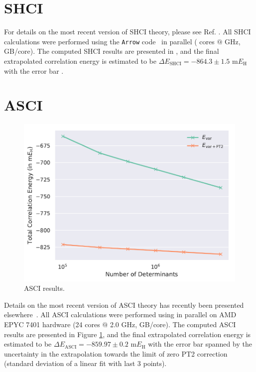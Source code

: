 \documentclass[journal=jcp,manuscript=suppinfo]{achemso}
\begin{document}
\section{SHCI}

For details on the most recent version of SHCI theory, please see Ref. . All SHCI calculations were performed using the {\texttt{Arrow}} code~\cite{arrow} in parallel {\color{red}{on what hardware???}} ({\color{red}{XX}} cores $@$ {\color{red}{XX}} GHz, {\color{red}{XX}} GB/core). The computed SHCI results are presented in {}, and the final extrapolated correlation energy is estimated to be $\Delta E_{\text{SHCI}} = -864.3\pm1.5$ m$E_{\text{H}}$ with the error bar {\color{red}{derived how???}}.

\section{ASCI}

%
\begin{figure}[ht!]
\begin{center}
\includegraphics[scale=0.75]{figures/asci/asci.pdf}
\caption{ASCI results.}
\label{asci_SI_fig}
\end{center}
\vspace{-0.6cm}
\end{figure}
%
Details on the most recent version of ASCI theory has recently been presented elsewhere~\cite{tubman_whaley_selected_ci_jctc_2020,tubman_whaley_selected_ci_pt_arxiv_2018}. All ASCI calculations were performed using {\color{red}{what code???}} in parallel on AMD EPYC 7401 hardware (24 cores $@$ 2.0 GHz, {\color{red}{XX}} GB/core). The computed ASCI results are presented in Figure \ref{asci_SI_fig}, and the final extrapolated correlation energy is estimated to be $\Delta E_{\text{ASCI}} = -859.97\pm0.2$ m$E_{\text{H}}$ with the error bar spanned by the uncertainty in the extrapolation towards the limit of zero PT2 correction (standard deviation of a linear fit with last 3 points).
\end{document}

